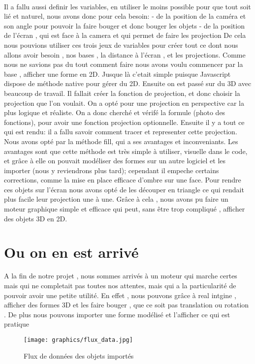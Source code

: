 \paragraph{}
Il a fallu aussi definir les variables, en utiliser le moins possible pour que tout soit lié et naturel, nous avons donc pour cela besoin:
- de la position de la caméra et son angle pour pouvoir la faire bouger et donc bouger les objets
- de la position de l'écran  , qui est face à la camera et qui permet de faire les projection
De cela nous pouvions utiliser ces trois jeux de variables pour créer tout ce dont nous allons avoir besoin , nos bases , la distance à l'écran , et les projections.
 Comme nous ne savions pas du tout comment faire nous avons voulu commencer par la base , afficher une forme en 2D. Jusque là c'etait simple puisque Javascript dispose de méthode native pour gérer du 2D.
 Ensuite on est passé sur du 3D avec beaucoup de travail.
 Il fallait créer la fonction de projection, et donc choisir la projection que l'on voulait. On a opté pour une projection en perspective car la plus logique et réaliste.
 On a donc cherché et vérifé la formule  (photo des fonctions), pour avoir une fonction projection optionnelle.
 Ensuite il y a tout ce qui est rendu: il a fallu savoir comment tracer et representer cette projection. Nous avons opté par la méthode fill, qui a ses avantages et inconveniants. Les avantages sont que cette méthode est très simple à utiliser, visuelle dans le code, et grâce à elle on pouvait modéliser des formes sur un autre logiciel et les importer (nous y reviendrons plus  tard); cependant il empeche certains corrections, comme la mise en place efficace d'ombre sur une face.
 Pour rendre ces objets sur l'écran nous avons opté de les découper en triangle ce qui rendait plus facile leur projection une à une.
 Grâce à cela , nous avons pu faire un moteur graphique simple et efficace qui peut, sans être trop compliqué , afficher des objets 3D en 2D.
\section{Ou on en est arrivé}
 A la fin de notre projet , nous sommes arrivés à un moteur qui marche certes mais qui ne completait pas toutes nos attentes, mais qui a la particularité de pouvoir avoir une petite utilité.
 En effet , nous pouvons grâce à real intgine , afficher des formes 3D et les faire bouger , que ce soit pas translation ou rotation .
 De plus nous pouvons importer une forme modélisé et l'afficher ce qui est pratique
\begin{figure}[H]
  \centering
  \texttt{[image: graphics/flux\_data.jpg]}
  \caption{Flux de données des objets importés}
  \label{structure_capital}
\end{figure}

